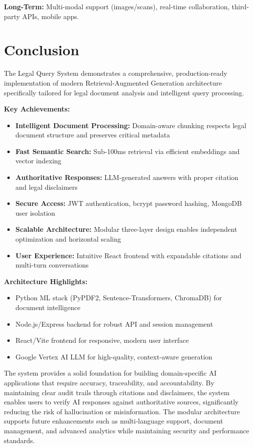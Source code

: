 \documentclass[12pt,a4paper]{article}
\begin{document}
\textbf{Long-Term:} Multi-modal support (images/scans), real-time collaboration, third-party APIs, mobile apps.

\section{Conclusion}

The Legal Query System demonstrates a comprehensive, production-ready implementation of modern Retrieval-Augmented Generation architecture specifically tailored for legal document analysis and intelligent query processing. 

\textbf{Key Achievements:}
\begin{itemize}
    \item \textbf{Intelligent Document Processing:} Domain-aware chunking respects legal document structure and preserves critical metadata
    \item \textbf{Fast Semantic Search:} Sub-100ms retrieval via efficient embeddings and vector indexing
    \item \textbf{Authoritative Responses:} LLM-generated answers with proper citation and legal disclaimers
    \item \textbf{Secure Access:} JWT authentication, bcrypt password hashing, MongoDB user isolation
    \item \textbf{Scalable Architecture:} Modular three-layer design enables independent optimization and horizontal scaling
    \item \textbf{User Experience:} Intuitive React frontend with expandable citations and multi-turn conversations
\end{itemize}

\textbf{Architecture Highlights:}
\begin{itemize}
    \item Python ML stack (PyPDF2, Sentence-Transformers, ChromaDB) for document intelligence
    \item Node.js/Express backend for robust API and session management
    \item React/Vite frontend for responsive, modern user interface
    \item Google Vertex AI LLM for high-quality, context-aware generation
\end{itemize}

The system provides a solid foundation for building domain-specific AI applications that require accuracy, traceability, and accountability. By maintaining clear audit trails through citations and disclaimers, the system enables users to verify AI responses against authoritative sources, significantly reducing the risk of hallucination or misinformation. The modular architecture supports future enhancements such as multi-language support, document management, and advanced analytics while maintaining security and performance standards.\
\end{document}
